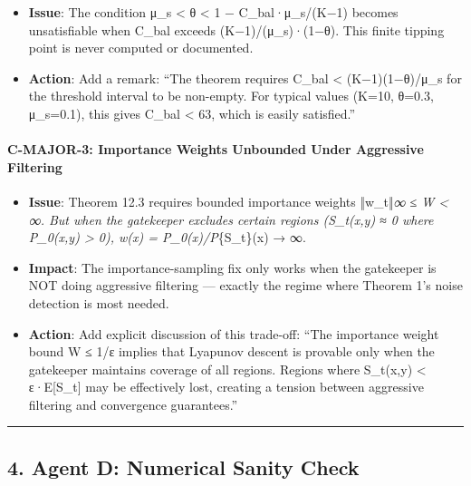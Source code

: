 \documentclass[
  12pt,
]{ctexart}
\providecommand{\tightlist}{%
  \setlength{\itemsep}{0pt}\setlength{\parskip}{0pt}}
\begin{document}
\begin{itemize}
\tightlist
\item
  \textbf{Issue}: The condition μ\_s \textless{} θ \textless{} 1 −
  C\_bal·μ\_s/(K−1) becomes unsatisfiable when C\_bal exceeds
  (K−1)/(μ\_s)·(1−θ). This finite tipping point is never computed or
  documented.
\item
  \textbf{Action}: Add a remark: ``The theorem requires C\_bal
  \textless{} (K−1)(1−θ)/μ\_s for the threshold interval to be
  non-empty. For typical values (K=10, θ=0.3, μ\_s=0.1), this gives
  C\_bal \textless{} 63, which is easily satisfied.''
\end{itemize}

\paragraph{C-MAJOR-3: Importance Weights Unbounded Under Aggressive
Filtering}\label{c-major-3-importance-weights-unbounded-under-aggressive-filtering}

\begin{itemize}
\tightlist
\item
  \textbf{Issue}: Theorem 12.3 requires bounded importance weights
  ‖w\_t‖\emph{∞ ≤ W \textless{} ∞. But when the gatekeeper excludes
  certain regions (S\_t(x,y) ≈ 0 where P\_0(x,y) \textgreater{} 0), w(x)
  = P\_0(x)/P}\{S\_t\}(x) → ∞.
\item
  \textbf{Impact}: The importance-sampling fix only works when the
  gatekeeper is NOT doing aggressive filtering --- exactly the regime
  where Theorem 1's noise detection is most needed.
\item
  \textbf{Action}: Add explicit discussion of this trade-off: ``The
  importance weight bound W ≤ 1/ε implies that Lyapunov descent is
  provable only when the gatekeeper maintains coverage of all regions.
  Regions where S\_t(x,y) \textless{} ε·E{[}S\_t{]} may be effectively
  lost, creating a tension between aggressive filtering and convergence
  guarantees.''
\end{itemize}

\begin{center}\rule{0.5\linewidth}{0.5pt}\end{center}

\subsection{4. Agent D: Numerical Sanity
Check}\label{agent-d-numerical-sanity-check}
\end{document}
